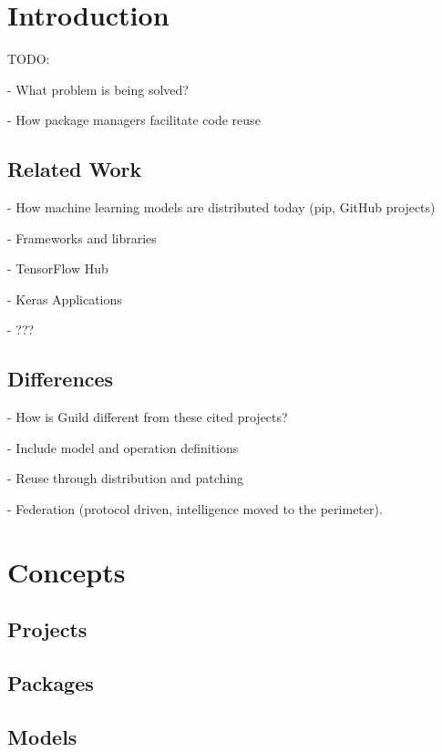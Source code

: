\documentclass{article}
\begin{document}
\printAffiliationsAndNotice{}  %

\section{Introduction}

TODO:

- What problem is being solved?

- How package managers facilitate code reuse

\subsection{Related Work}

- How machine learning models are distributed today (pip, GitHub
projects)

- Frameworks and libraries

- TensorFlow Hub

- Keras Applications

- ???

\subsection{Differences}

- How is Guild different from these cited projects?

- Include model and operation definitions

- Reuse through distribution and patching

- Federation (protocol driven, intelligence moved to the perimeter).

\section{Concepts}

\subsection{Projects}

\subsection{Packages}

\subsection{Models}
\end{document}
